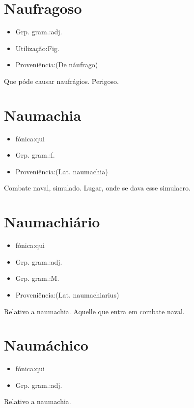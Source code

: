 \section{Naufragoso}
\begin{itemize}
\item {Grp. gram.:adj.}
\end{itemize}
\begin{itemize}
\item {Utilização:Fig.}
\end{itemize}
\begin{itemize}
\item {Proveniência:(De \textunderscore náufrago\textunderscore )}
\end{itemize}
Que póde causar naufrágios.
Perigoso.
\section{Naumachia}
\begin{itemize}
\item {fónica:qui}
\end{itemize}
\begin{itemize}
\item {Grp. gram.:f.}
\end{itemize}
\begin{itemize}
\item {Proveniência:(Lat. \textunderscore naumachia\textunderscore )}
\end{itemize}
Combate naval, simulado.
Lugar, onde se dava esse simulacro.
\section{Naumachiário}
\begin{itemize}
\item {fónica:qui}
\end{itemize}
\begin{itemize}
\item {Grp. gram.:adj.}
\end{itemize}
\begin{itemize}
\item {Grp. gram.:M.}
\end{itemize}
\begin{itemize}
\item {Proveniência:(Lat. \textunderscore naumachiarius\textunderscore )}
\end{itemize}
Relativo a naumachia.
Aquelle que entra em combate naval.
\section{Naumáchico}
\begin{itemize}
\item {fónica:qui}
\end{itemize}
\begin{itemize}
\item {Grp. gram.:adj.}
\end{itemize}
Relativo a naumachia.
